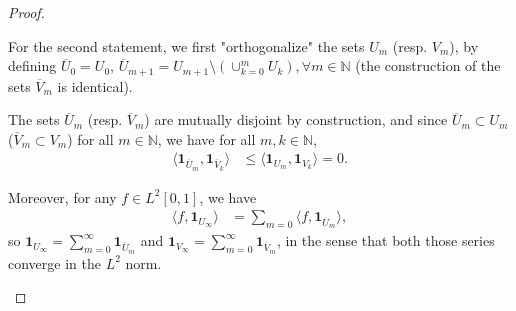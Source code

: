 \documentclass[11pt]{article}
\def\N{\mathbb{N}}
\def\II{\bm{1}}
\theoremstyle{definition}
\begin{document}
\begin{proof}
\begin{itemize}
        For the second statement, we first "orthogonalize" the sets $U_m$ (resp. $V_m$), by defining $\overline{U}_0 = U_0$, $\overline{U}_{m+1} = U_{m+1} \setminus (\cup_{k=0}^m U_k), \forall m \in \N$ (the construction of the sets $\overline{V}_m$ is identical).

        The sets $\overline{U}_m$ (resp. $\overline{V}_m$) are mutually disjoint by construction, and since $\overline{U}_m \subset U_m$ ($\overline{V}_m \subset V_m$) for all $m\in \N$, we have for all $m, k \in \N$,
        \begin{align*}
        \langle \II_{\overline{U}_m}, \II_{\overline{V}_k} \rangle &\le \langle \II_{U_m}, \II_{V_k} \rangle = 0.
        \end{align*}

        Moreover, for any $f \in L^2 [0,1]$, we have
        \begin{align*}
            \langle f, \II_{U_\infty} \rangle &= \sum_{m=0} \langle f, \II_{\overline{U}_m} \rangle,
        \end{align*}
        so $\II_{U_\infty} = \sum_{m=0}^\infty \II_{\overline{U}_m}$ and $\II_{V_\infty} = \sum_{m=0}^\infty \II_{\overline{V}_m}$, in the sense that both those series converge in the $L^2$ norm.


\end{itemize}
\end{proof}
\end{document}
